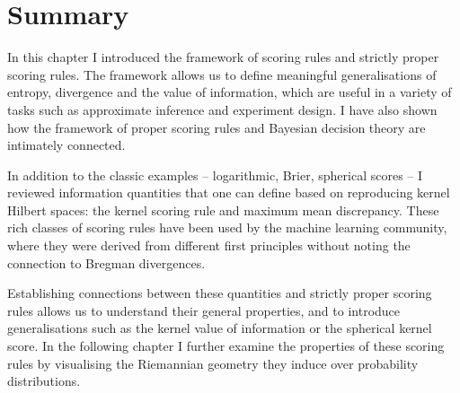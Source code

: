\section{Summary}

In this chapter I introduced the framework of scoring rules and strictly proper scoring rules. The framework allows us to define meaningful generalisations of entropy, divergence and the value of information, which are useful in a variety of tasks such as approximate inference and experiment design. I have also shown how the framework of proper scoring rules and Bayesian decision theory are intimately connected.

In addition to the classic examples -- logarithmic, Brier, spherical scores -- I reviewed information quantities that one can define based on reproducing kernel Hilbert spaces: the kernel scoring rule and maximum mean discrepancy. These rich classes of scoring rules have been used by the machine learning community, where they were derived from different first principles without noting the connection to Bregman divergences.

Establishing connections between these quantities and strictly proper scoring rules allows us to understand their general properties, and to introduce generalisations such as the kernel value of information or the spherical kernel score. In the following chapter I further examine the properties of these scoring rules by visualising the Riemannian geometry they induce over probability distributions.